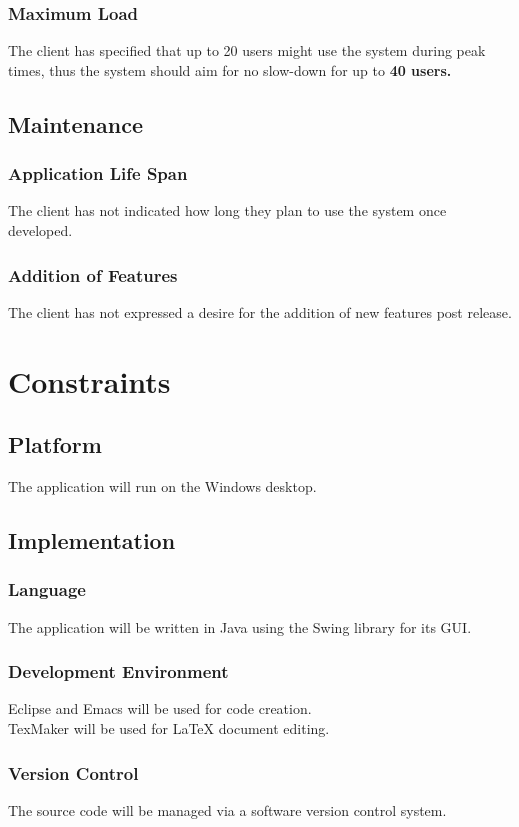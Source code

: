 \documentclass{article}
\begin{document}
\subsubsection{Maximum Load}
The client has specified that up to 20 users might use the system during
peak times, thus the system should aim for no slow-down for up to \textbf{40 users.}
\subsection{Maintenance}
\subsubsection{Application Life Span}
The client has not indicated how long they plan to use the system once developed.
\subsubsection{Addition of Features}
The client has not expressed a desire for the addition of new
features post release.

\section{Constraints}
\subsection{Platform}
The application will run on the Windows desktop.
\subsection{Implementation}
\subsubsection{Language}
The application will be written in Java using the Swing library for its GUI.
\subsubsection{Development Environment}
Eclipse and Emacs will be used for code creation.\\
TexMaker will be used for {\LaTeX} document editing.
\subsubsection{Version Control}
The source code will be managed via a software version control system.
\end{document}
